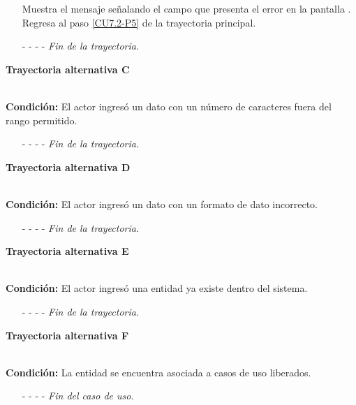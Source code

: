\begin{enumerate}
	\UCpaso[\UCsist] Muestra el mensaje  señalando el campo que presenta el error en la pantalla .
	\UCpaso Regresa al paso \ref{CU7.2-P5} de la trayectoria principal.
	\item[- -] - - {\em {Fin de la trayectoria}}.%
\end{enumerate}
\hypertarget{CU7-2:TAC}{\textbf{Trayectoria alternativa C}}\\
\noindent \textbf{Condición:} El actor ingresó un dato con un número de caracteres fuera del rango permitido.
\begin{enumerate}
	\UCpaso[\UCsist] Muestra el mensaje  señalando el campo que presenta el error en la pantalla .
	\UCpaso Regresa al paso \ref{CU7.2-P5} de la trayectoria principal.
	\item[- -] - - {\em {Fin de la trayectoria}}.%
\end{enumerate}
\hypertarget{CU7-2:TAD}{\textbf{Trayectoria alternativa D}}\\
\noindent \textbf{Condición:} El actor ingresó un dato con un formato de dato incorrecto.
\begin{enumerate}
	\UCpaso[\UCsist] Muestra el mensaje  señalando el campo que presenta el error en la pantalla .
	\UCpaso Regresa al paso \ref{CU7.2-P5} de la trayectoria principal.
	\item[- -] - - {\em {Fin de la trayectoria}}.
\end{enumerate}
\hypertarget{CU7-2:TAE}{\textbf{Trayectoria alternativa E}}\\
\noindent \textbf{Condición:} El actor ingresó una entidad ya existe dentro del sistema.
\begin{enumerate}
	\UCpaso[\UCsist] Muestra el mensaje  señalando el campo que presenta la duplicidad en la pantalla .
	\UCpaso Regresa al paso \ref{CU7.2-P5} de la trayectoria principal.
	\item[- -] - - {\em {Fin de la trayectoria}}.
\end{enumerate}
\hypertarget{CU7-2:TAF}{\textbf{Trayectoria alternativa F}}\\
\noindent \textbf{Condición:} La entidad se encuentra asociada a casos de uso liberados.
\begin{enumerate}
	\UCpaso[\UCsist] Oculta el botón \editar de la entidad que esta asociada a casos de uso liberados.
	\item[- -] - - {\em {Fin del caso de uso}}.
\end{enumerate}